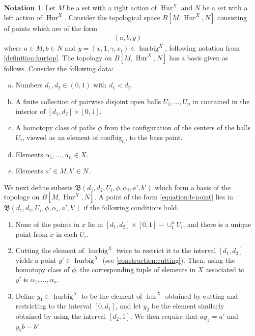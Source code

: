 \documentclass[12 pt]{amsart}
\theoremstyle{plain}
\theoremstyle{definition}
\newtheorem{notation}[theorem]{Notation}
\theoremstyle{remark}
\numberwithin{equation}{section}
\DeclareMathOperator\Hur{Hur}
\begin{document}
\begin{notation}\label{definition:twosidedbartop}
	Let $M$ be a set with a right action of
$\Hur^{X}$ and $N$ be a set with a left action of $\Hur^X$.
	Consider the topological
	space $B[M,\Hur^{X},N]$
	consisting of points which are of the form
	\begin{align}
		\label{equation:b-point}
		(a,b, y)
	\end{align}
	where $a \in M, b \in N$ and 
	$y = (x,1,\gamma,x_i) \in \operatorname{hurbig}^X$, following notation
	from \autoref{definition:hurtop}. The topology on $B[M,\Hur^{X},N]$ has a basis given as follows. Consider the following data:
	
	\begin{enumerate}[(a)]
		\item Numbers $d_1,d_2\in (0,1)$ with $d_1 < d_2$.
		\item A finite collection of pairwise disjoint open balls
			$U_1,\ldots,U_n$ in contained in the interior of
		$[d_1,d_2]\times [0,1]$.
		\item A homotopy class of paths $\phi$ from the configuration of
			the centers of the
			balls $U_i$, viewed as an element of
			$\mathrm{confbig}_n$, to the base point.
		\item Elements $\alpha_1,\ldots,\alpha_n \in X$.
		\item Elements $a' \in M, b'\in N$.
	\end{enumerate}

	We next define subsets $\mathfrak B(d_1,d_2,U_i,\phi,\alpha_i,a',b')$
	which form a basis of the topology on $B[M,\Hur^{X},N]$. 
	A point of the form \eqref{equation:b-point} lies in
	$\mathfrak B(d_1,d_2,U_i,\phi,\alpha_i,a',b')$ 
	if the following conditions hold.
	\begin{enumerate}
		\item None of the points in $x$ lie in $[d_1,d_2]\times [0,1]- \cup_1^n U_i$, and there is a unique point from $x$ in each $U_i$.
		\item Cutting the element of $\operatorname{hurbig}^X$ twice to
			restrict it to the interval $[d_1,d_2]$ yields a point
			$y' \in \operatorname{hurbig}^X$ (see
			\autoref{construction:cutting}). Then, using the homotopy
			class of $\phi$, the corresponding tuple of elements in
			$X$ associated to $y'$ is $\alpha_1,\ldots,\alpha_n$.
		\item[(3)] Define $y_1 \in \operatorname{hurbig}^X$ to be the
		element of $\operatorname{hur}^{X}$ obtained
		by
		cutting and restricting to the interval $[0,d_1]$, and let $y_2$ be the element similarly obtained by using the interval $[d_2,1]$.
		We then require that $ay_1 =a'$ and $y_2b=b'$.
	\end{enumerate}
\end{notation}
\end{document}
